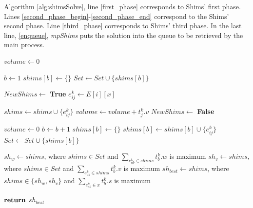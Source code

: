 \documentclass[preprint,authoryear]{elsarticle}
\begin{document}
Algorithm \ref{alg:shimsSolve}, line \ref{first_phase} corresponds to Shims' first phase. Lines  \ref{second_phase_begin}-\ref{second_phase_end} correspond to the Shims' second phase.
Line \ref{third_phase} corresponds to Shims' third phase. In the last line, \ref{enqueue}, {\it mpShims} puts the solution into the queue to be retrieved by the main process.


\begin{algorithm}[H]
	\caption{ $getBestShims(i,\ \eta_1,\ \eta_2,\ E,\ k,\ slack)$ }  \label{alg:getBestShims}
	\begin{algorithmic}[1]
		
		\State $volume \gets 0$	
		
		\State $b \gets 1$
		\State $shims[b] \gets \{\}$  \label{empty_shims}
		\State $Set \gets Set \cup \{shims[b]\}$ \label{empty_set}
		
		 \label{edges_indexes}
				

			\State $NewShims \gets$ {\bf True} \label{new_shims}
			\State $e_{ij}^k \gets E[i][x]$
			
			 \label{shims_set}
							
				
					
					\State $shims \gets shims \cup \{e_{ij}^k\}$
					\State $volume \gets volume + t_j^k.v$
					\State $NewShims \gets$ {\bf False} \label{new_shims_false}
		
		
				\EndIf
			
			\EndFor 
		
			 \label{new_shims2}
				\State $volume \gets 0$
				\State $b \gets b + 1$
				\State $shims[b] \gets \{\}$
				\State $shims[b] \gets shims[b] \cup \{e_{ij}^k\}$
				\State $Set \gets Set \cup \{shims[b]\}$
			\EndIf

		\EndFor 
		
		\State $sh_w \gets shims$, where $shims \in Set$ and $\sum_{e_{ab}^k \in shims} t_b^k.w$ is maximum  \label{best_weight}		
		\State $sh_v \gets shims$, where $shims \in Set$ and $\sum_{e_{ab}^k \in shims} t_b^k.v$ is maximum \label{best_volume}
		\State $sh_{best} \gets shims$, where $shims \in \{sh_w, sh_v\}$ and $\sum_{e_{ab}^k \in x} t_b^k.s$ is maximum \label{best_score}
		
		\State ${\bf return}$ $sh_{best}$
		
	\end{algorithmic}
\end{algorithm}
\end{document}
